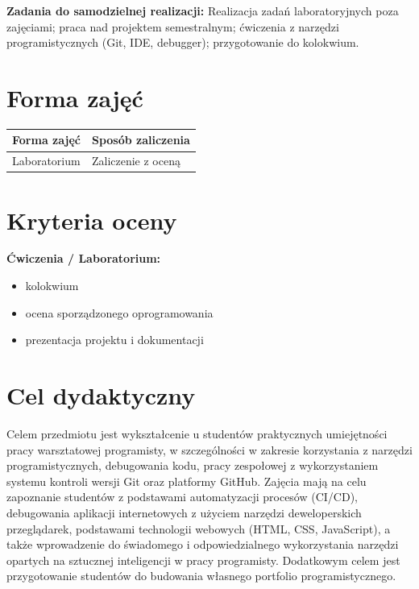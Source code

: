 \documentclass[12pt, a4paper]{article}
\newcommand{\thdrule}{\noalign{\global\setlength{\extrarowheight}{0pt}}}
\newcommand{\thdend}{\noalign{\global\setlength{\extrarowheight}{3pt}}}
\begin{document}
\vspace{4pt}
\noindent\textbf{Zadania do samodzielnej realizacji:} Realizacja zadań laboratoryjnych poza zajęciami; praca nad projektem semestralnym; ćwiczenia z narzędzi programistycznych (Git, IDE, debugger); przygotowanie do kolokwium.

\section{Forma zajęć}

\begin{center}
{\scriptsize
\begin{tabular}{m{5cm}m{8cm}}
\thdrule\toprule
\rowcolor{pjatkRed} {\color{white}\textbf{Forma zajęć}} & {\color{white}\textbf{Sposób zaliczenia}} \\
\midrule\thdend
  \rowcolor{tableRowLight} Laboratorium & Zaliczenie z oceną \\
\bottomrule
\end{tabular}}
\end{center}

\section{Kryteria oceny}

\textbf{Ćwiczenia / Laboratorium:}
\begin{itemize}
  \item kolokwium
  \item ocena sporządzonego oprogramowania
  \item prezentacja projektu i dokumentacji
\end{itemize}


\section{Cel dydaktyczny}

Celem przedmiotu jest wykształcenie u studentów praktycznych umiejętności pracy warsztatowej programisty, w szczególności w zakresie korzystania z narzędzi programistycznych, debugowania kodu, pracy zespołowej z wykorzystaniem systemu kontroli wersji Git oraz platformy GitHub. Zajęcia mają na celu zapoznanie studentów z podstawami automatyzacji procesów (CI/CD), debugowania aplikacji internetowych z użyciem narzędzi deweloperskich przeglądarek, podstawami technologii webowych (HTML, CSS, JavaScript), a także wprowadzenie do świadomego i odpowiedzialnego wykorzystania narzędzi opartych na sztucznej inteligencji w pracy programisty. Dodatkowym celem jest przygotowanie studentów do budowania własnego portfolio programistycznego.
\end{document}
